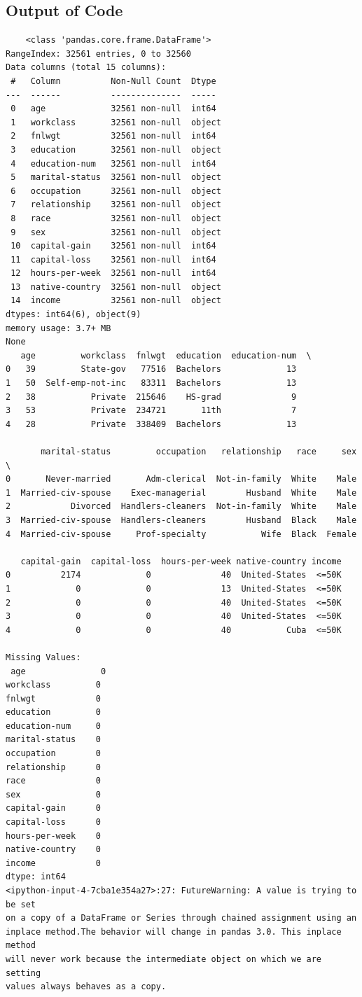 \documentclass[a4paper,12pt]{article}
\begin{document}
\subsection{Output of Code}

\begin{verbatim}
    <class 'pandas.core.frame.DataFrame'>
RangeIndex: 32561 entries, 0 to 32560
Data columns (total 15 columns):
 #   Column          Non-Null Count  Dtype 
---  ------          --------------  ----- 
 0   age             32561 non-null  int64 
 1   workclass       32561 non-null  object
 2   fnlwgt          32561 non-null  int64 
 3   education       32561 non-null  object
 4   education-num   32561 non-null  int64 
 5   marital-status  32561 non-null  object
 6   occupation      32561 non-null  object
 7   relationship    32561 non-null  object
 8   race            32561 non-null  object
 9   sex             32561 non-null  object
 10  capital-gain    32561 non-null  int64 
 11  capital-loss    32561 non-null  int64 
 12  hours-per-week  32561 non-null  int64 
 13  native-country  32561 non-null  object
 14  income          32561 non-null  object
dtypes: int64(6), object(9)
memory usage: 3.7+ MB
None
   age         workclass  fnlwgt  education  education-num  \
0   39         State-gov   77516  Bachelors             13   
1   50  Self-emp-not-inc   83311  Bachelors             13   
2   38           Private  215646    HS-grad              9   
3   53           Private  234721       11th              7   
4   28           Private  338409  Bachelors             13   

       marital-status         occupation   relationship   race     sex  \
0       Never-married       Adm-clerical  Not-in-family  White    Male   
1  Married-civ-spouse    Exec-managerial        Husband  White    Male   
2            Divorced  Handlers-cleaners  Not-in-family  White    Male   
3  Married-civ-spouse  Handlers-cleaners        Husband  Black    Male   
4  Married-civ-spouse     Prof-specialty           Wife  Black  Female   

   capital-gain  capital-loss  hours-per-week native-country income  
0          2174             0              40  United-States  <=50K  
1             0             0              13  United-States  <=50K  
2             0             0              40  United-States  <=50K  
3             0             0              40  United-States  <=50K  
4             0             0              40           Cuba  <=50K  

Missing Values:
 age               0
workclass         0
fnlwgt            0
education         0
education-num     0
marital-status    0
occupation        0
relationship      0
race              0
sex               0
capital-gain      0
capital-loss      0
hours-per-week    0
native-country    0
income            0
dtype: int64
<ipython-input-4-7cba1e354a27>:27: FutureWarning: A value is trying to be set 
on a copy of a DataFrame or Series through chained assignment using an 
inplace method.The behavior will change in pandas 3.0. This inplace method 
will never work because the intermediate object on which we are setting 
values always behaves as a copy.


\end{verbatim}
\end{document}
